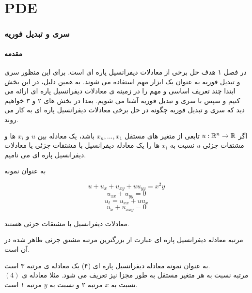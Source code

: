 \part{PDE}
\section{سری و تبدیل فوریه}
\subsection*{مقدمه}
در فصل ۱ هدف حل برخی از معادلات دیفرانسیل پاره ای است. برای این منظور سری و تبدیل فوریه به عنوان یک ابزار مهم استفاده می شوند. به همین دلیل، در این بخش ابتدا چند تعریف اساسی و مهم را در زمینه ی معادلات دیفرانسیل پاره ای ارائه می کنیم و سپس با سری و تبدیل فوریه آشنا می شویم. بعدا در بخش های ۲ و ۳ خواهیم دید که سری و تبدیل فوریه چگونه در حل برخی معادلات دیفرانسیل پاره ای به کار می روند.\\
\begin{definition}
 اگر 
$u:\mathbb{R}^n \to \mathbb{R}$
تابعی از متغیر های مستقل
$x_n,...,x_1$
باشد، یک معادله بین 
$u$
و 
$x_i$
 ها و مشتقات جزئی
 $u$
 نسبت به
 $x_i$
 ها را یک معادله دیفرانسیل با مشتقات جزئی یا معادلات دیفرانسیل پاره ای می نامیم.\\
\end{definition}
 به عنوان نمونه

 \begin{equation}
u+u_x+u_{xy}+uu_{yy}=x^2y
\end{equation}
\begin{equation}
u_{xx}+u_{yy}=0
\end{equation}
\begin{equation}
u_t=u_{xx}+uu_x
\end{equation}
\begin{equation}
u_x+u_{xxy}=0
\end{equation}

معادلات دیفرانسیل با مشتقات جزئی هستند.\\

\begin{definition}
 مرتبه معادله دیفرانسیل پاره ای عبارت از بزرگترین مرتبه مشتق جزئی ظاهر شده در آن است.
\end{definition}
  به عنوان نمونه معادله دیفرانسیل پاره ای (۴) یک معادله ی مرتبه ۳ است.\\
مرتبه نسبت به هر متغیر مستقل به طور مجزا نیز تعریف می شود. مثلا معادله ی 
$(4)$
 نسبت به 
$x$
مرتبه ۲ و نسبت به 
$y$
مرتبه ۱ است.\\


